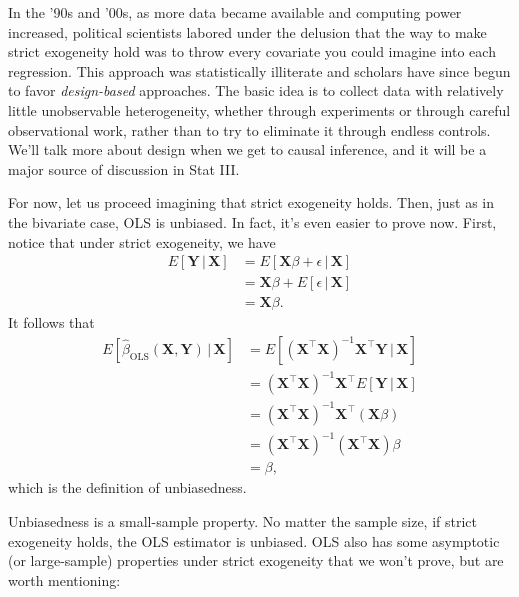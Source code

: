 \documentclass[
  12pt,
  oneside,openany]{book}
\begin{document}
In the '90s and '00s, as more data became available and computing power increased, political scientists labored under the delusion that the way to make strict exogeneity hold was to throw every covariate you could imagine into each regression. This approach was statistically illiterate \citep{clarke2005phantom} and scholars have since begun to favor \emph{design-based} approaches. The basic idea is to collect data with relatively little unobservable heterogeneity, whether through experiments or through careful observational work, rather than to try to eliminate it through endless controls. We'll talk more about design when we get to causal inference, and it will be a major source of discussion in Stat III.

For now, let us proceed imagining that strict exogeneity holds. Then, just as in the bivariate case, OLS is unbiased. In fact, it's even easier to prove now. First, notice that under strict exogeneity, we have
\[
\begin{aligned}
E[\mathbf{Y} \,|\, \mathbf{X}]
&= E[\mathbf{X} \beta + \epsilon \,|\, \mathbf{X}] \\
&= \mathbf{X} \beta + E[\epsilon \,|\, \mathbf{X}] \\
&= \mathbf{X} \beta.
\end{aligned}
\]
It follows that
\[
\begin{aligned}
E[\hat{\beta}_{\text{OLS}}(\mathbf{X}, \mathbf{Y}) \,|\, \mathbf{X}]
&= E[(\mathbf{X}^\top \mathbf{X})^{-1} \mathbf{X}^\top \mathbf{Y} \,|\, \mathbf{X}] \\
&= (\mathbf{X}^\top \mathbf{X})^{-1} \mathbf{X}^\top E[\mathbf{Y} \,|\, \mathbf{X}] \\
&= (\mathbf{X}^\top \mathbf{X})^{-1} \mathbf{X}^\top (\mathbf{X} \beta) \\
&= (\mathbf{X}^\top \mathbf{X})^{-1} (\mathbf{X}^\top \mathbf{X}) \beta \\
&= \beta,
\end{aligned}
\]
which is the definition of unbiasedness.

Unbiasedness is a small-sample property. No matter the sample size, if strict exogeneity holds, the OLS estimator is unbiased. OLS also has some asymptotic (or large-sample) properties under strict exogeneity that we won't prove, but are worth mentioning:
\end{document}
